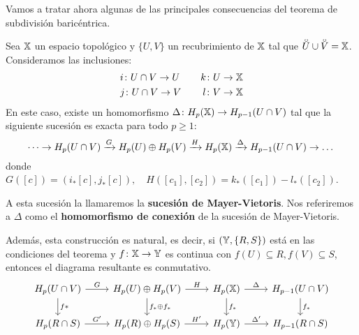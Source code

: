 Vamos a tratar ahora algunas de las principales consecuencias del teorema de subdivisión baricéntrica.

\begin{theorem}
  Sea ${\mathbb X}$ un espacio topológico y $\{U, V\}$ un recubrimiento de ${\mathbb X}$ tal que $\interior{U} \cup \interior{V} = \X$. Consideramos las inclusiones:
  \begin{align*}
    & i \colon U \cap V \to U &\quad k \colon U \to {\mathbb X} \\
    & j \colon U \cap V \to V &\quad l \colon V \to {\mathbb X}
  \end{align*}
  En este caso, existe un homomorfismo $\Delta \colon H_p({\mathbb X}) \to H_{p-1}(U \cap V)$ tal que la siguiente sucesión es exacta para todo $p \geq 1$:
  \[ \dots \to H_p(U \cap V) \xrightarrow{G} H_p(U) \oplus H_p(V) \xrightarrow{H} H_p({\mathbb X}) \xrightarrow{\Delta} H_{p-1}(U \cap V) \to \dots \]
  donde $G([c]) = (i_*[c], j_*[c]), \quad H([c_1], [c_2]) = k_*([c_1]) - l_*([c_2])$.

  A esta sucesión la llamaremos la \textbf{sucesión de Mayer-Vietoris}. Nos referiremos a $\Delta$ como el \textbf{homomorfismo de conexión}
  de la sucesión de Mayer-Vietoris.

  Además, esta construcción es natural, es decir, si $({\mathbb Y}, \{R, S\})$ está en las condiciones del teorema y $f \colon {\mathbb X} \to {\mathbb Y}$ es continua con
  $f(U) \subseteq R, f(V) \subseteq S$, entonces el diagrama resultante es conmutativo.
  \[ \begin{tikzcd}
    H_p(U \cap V) \arrow{r}{G} \arrow{d}{f*} & H_p(U) \oplus H_p(V) \arrow{r}{H} \arrow{d}{f_*  \oplus f_*} & H_p(\X) \arrow{r}{\Delta} \arrow{d}{f_*} & H_{p-1}(U \cap V) \arrow{d}{f_*} \\
    H_p(R \cap S) \arrow{r}{G'}  & H_p(R) \oplus H_p(S) \arrow{r}{H'} & H_p(\Y) \arrow{r}{\Delta'} & H_{p-1}(R \cap S)
  \end{tikzcd} \]

\end{theorem}

